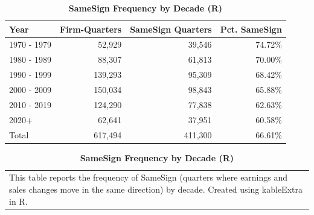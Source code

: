 \documentclass[english,authoryear,IEEEtran,12pt]{article}
\begin{document}
\begin{table}[htbp]\centering\footnotesize{
\renewcommand{\arraystretch}{1.5}
\caption{\textbf{SameSign Frequency by Decade (R)} \label{tab:freq-r}}

\begin{tabular}[t]{lrrr}
\toprule
Year & Firm-Quarters & SameSign Quarters & Pct. SameSign\\
\midrule
1970 - 1979 & 52,929 & 39,546 & 74.72\%\\
1980 - 1989 & 88,307 & 61,813 & 70.00\%\\
1990 - 1999 & 139,293 & 95,309 & 68.42\%\\
2000 - 2009 & 150,034 & 98,843 & 65.88\%\\
2010 - 2019 & 124,290 & 77,838 & 62.63\%\\
2020+ & 62,641 & 37,951 & 60.58\%\\
Total & 617,494 & 411,300 & 66.61\%\\
\bottomrule
\end{tabular}

\vspace{-1.5\baselineskip}
\singlespace
\flushleft
\begin{tabular}{@{}p{\linewidth}@{}}
\footnotesize
This table reports the frequency of SameSign (quarters where earnings and sales changes move in the same direction) by decade. Created using kableExtra in R.
\end{tabular}
}
\end{table}


\clearpage\newpage

\end{document}
